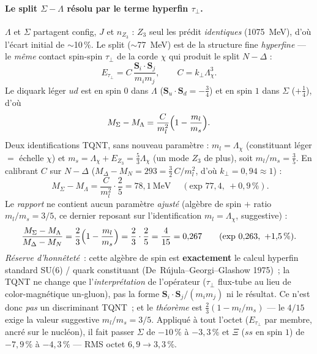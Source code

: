 \documentclass[11pt]{article}
\begin{document}
\paragraph{Le split $\Sigma{-}\Lambda$ résolu par le terme hyperfin $\tau_\perp$.}
$\Lambda$ et $\Sigma$ partagent config, $J$ et $n_{Z_3}$ : $Z_3$ seul les prédit \emph{identiques} (1075~MeV), d'où l'écart initial de $\sim$10\,\%. Le split ($\sim$77~MeV) est de la structure fine \emph{hyperfine} --- le \emph{même} contact spin-spin $\tau_\perp$ de la corde $\chi$ qui produit le split $N{-}\Delta$ :
\[
E_{\tau_\perp}=C\,\frac{\mathbf{S}_i\!\cdot\!\mathbf{S}_j}{m_i m_j},\qquad C=k_\perp\Lambda_\chi^3 .
\]
Le diquark léger $ud$ est en spin $0$ dans $\Lambda$ ($\mathbf{S}_u\!\cdot\!\mathbf{S}_d=-\tfrac34$) et en spin $1$ dans $\Sigma$ ($+\tfrac14$), d'où
\[
M_\Sigma-M_\Lambda=\frac{C}{m_l^2}\Bigl(1-\frac{m_l}{m_s}\Bigr).
\]
Deux identifications TQNT, sans nouveau paramètre : $m_l=\Lambda_\chi$ (constituant léger $=$ échelle $\chi$) et $m_s=\Lambda_\chi+E_{Z_3}=\tfrac53\Lambda_\chi$ (un mode $Z_3$ de plus), soit $m_l/m_s=\tfrac35$. En calibrant $C$ sur $N{-}\Delta$ ($M_\Delta-M_N=293=\tfrac32\,C/m_l^2$, d'où $k_\perp=0{,}94\approx1$) :
\[
\boxed{\;M_\Sigma-M_\Lambda=\frac{C}{m_l^2}\cdot\frac25=78{,}1~\text{MeV}\;}\quad(\text{exp }77{,}4,\ +0{,}9\,\%).
\]
Le \emph{rapport} ne contient aucun paramètre \emph{ajusté} (algèbre de spin $+$ ratio $m_l/m_s=3/5$, ce dernier reposant sur l'identification $m_l=\Lambda_\chi$, suggestive) :
\[
\frac{M_\Sigma-M_\Lambda}{M_\Delta-M_N}=\frac23\Bigl(1-\frac{m_l}{m_s}\Bigr)=\frac23\cdot\frac25=\frac{4}{15}=0{,}267\qquad(\text{exp }0{,}263,\ +1{,}5\,\%).
\]
\emph{Réserve d'honnêteté}~: cette algèbre de spin est \textbf{exactement} le calcul hyperfin standard SU(6) / quark constituant (De~Rújula--Georgi--Glashow 1975)~; la TQNT ne change que l'\emph{interprétation} de l'opérateur ($\tau_\perp$ flux-tube au lieu de color-magnétique un-gluon), pas la forme $\mathbf S_i\!\cdot\!\mathbf S_j/(m_im_j)$ ni le résultat. Ce n'est donc \emph{pas} un discriminant TQNT~; et le \emph{théorème} est $\tfrac23(1-m_l/m_s)$ --- le $4/15$ exige la valeur suggestive $m_l/m_s=3/5$.
Appliqué à tout l'octet ($E_{\tau_\perp}$ par membre, ancré sur le nucléon), il fait passer $\Sigma$ de $-10\,\%$ à $-3{,}3\,\%$ et $\Xi$ ($ss$ en spin $1$) de $-7{,}9\,\%$ à $-4{,}3\,\%$ --- RMS octet $6{,}9\to3{,}3\,\%$.
\end{document}
